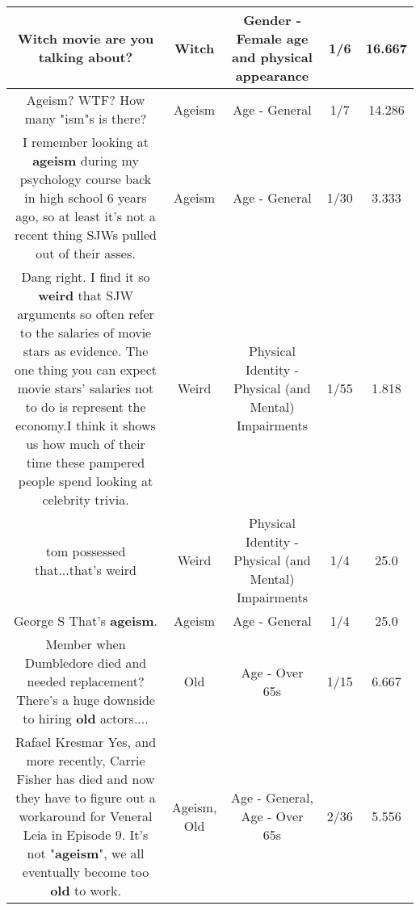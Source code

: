 \documentclass[11pt]{article}
\newlength\mylength
\begin{document}
\begin{center}
\begin{longtable}{|C{.65\mylength}|C{.30\mylength}|C{.12\mylength}|C{.12\mylength}|C{.12\mylength}|}
  \small Witch movie are you talking about?\normalsize   & Witch & Gender - Female age and physical appearance & 1/6 & 16.667 \\  \hline
  \small Ageism? WTF? How many "ism"s is there?\normalsize   & Ageism & Age - General & 1/7 & 14.286 \\  \hline
  \small I remember looking at \textbf{ageism} during my psychology course back in high school 6 years ago, so at least it's not a recent thing SJWs pulled out of their asses.\normalsize   & Ageism & Age - General & 1/30 & 3.333 \\  \hline
  \small Dang right. I find it so \textbf{weird} that SJW arguments so often refer to the salaries of movie stars as evidence. The one thing you can expect movie stars' salaries not to do is represent the economy.I think it shows us how much of their time these pampered people spend looking at celebrity trivia.\normalsize   & Weird & Physical Identity - Physical (and Mental) Impairments & 1/55 & 1.818 \\  \hline
  \small tom possessed that...that's weird\normalsize   & Weird & Physical Identity - Physical (and Mental) Impairments & 1/4 & 25.0 \\  \hline
  \small George S That's \textbf{ageism}.\normalsize   & Ageism & Age - General & 1/4 & 25.0 \\  \hline
  \small Member when Dumbledore died and needed replacement?There's a huge downside to hiring \textbf{old} actors....\normalsize   & Old & Age - Over 65s & 1/15 & 6.667 \\  \hline
  \small Rafael Kresmar Yes, and more recently, Carrie Fisher has died and now they have to figure out a workaround for Veneral Leia in Episode 9. It's not "\textbf{ageism}", we all eventually become too \textbf{old} to work.\normalsize   & Ageism, Old & Age - General, Age - Over 65s & 2/36 & 5.556 \\  \hline

\end{longtable}
\end{center}
\end{document}
